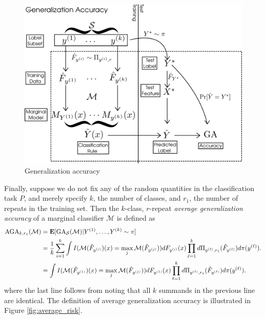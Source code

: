 \documentclass[12pt]{article}
\begin{document}
\begin{figure}[h]
\centering
\includegraphics[scale = 0.3]{risk.png}
\caption{Generalization accuracy}\label{fig:risk}
\end{figure}

Finally, suppose we do not fix any of the random quantities in the
classification task $P$, and merely specify $k$, the number of
classes, and $r_1$, the number of repeats in the training set.  
Then the $k$-class, $r$-repeat \emph{average generalization accuracy} of
a marginal classifier $\mathcal{M}$ is defined as
\begin{align*}
\text{AGA}_{k,r_1}(\mathcal{M}) &= \textbf{E}[\text{GA}_{\mathcal{S}}(\mathcal{M})|Y^{(1)}, \hdots, Y^{(k)} \sim \pi]
\\&= \frac{1}{k} \sum_{i=1}^k \int
I(\mathcal{M}(\hat{F}_{y^{(i)}})(x) = \max_j
\mathcal{M}(\hat{F}_{y^{(j)}})) dF_{y^{(i)}}(x) \prod_{\ell=1}^k
d\Pi_{y^{(\ell)}, r_1}(\hat{F}_{y^{(\ell)}}) d\pi(y^{(\ell)}).
\\&= \int
I(\mathcal{M}(\hat{F}_{y^{(1)}})(x) = \max_j
\mathcal{M}(\hat{F}_{y^{(j)}})) dF_{y^{(1)}}(x) \prod_{\ell=1}^k
d\Pi_{y^{(\ell)}, r_1}(\hat{F}_{y^{(\ell)}}) d\pi(y^{(\ell)}).
\end{align*}
where the last line follows from noting that all $k$ summands in the previous line are identical.
The definition of average generalization accuracy is illustrated in Figure \ref{fig:average_risk}.
\end{document}
